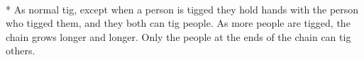 \begin{minipage}{\textwidth}
\\*
As normal tig, except when a person is tigged they hold hands with the person who tigged them, and they both can tig people.  As more people are tigged, the chain grows longer and longer.  Only the people at the ends of the chain can tig others.
\end{minipage}    \vfill

